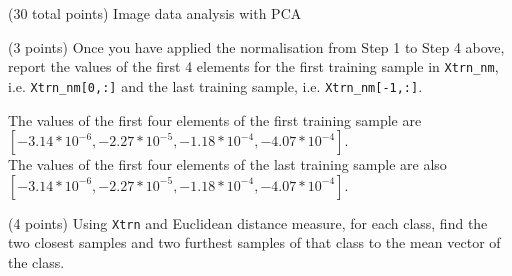 \documentclass[12pt]{article}
\begin{document}
\clearpage
%
%

\begin{question}{(30 total points) Image data analysis with PCA}

  
  

  
  \medskip

  \begin{subquestion}{(3 points)
      Once you have applied the normalisation from Step 1 to Step 4 above,
      report the values of the first 4 elements for the first training
      sample in \texttt{Xtrn\_nm},
      i.e. \texttt{Xtrn\_nm[0,:]} and the last training sample,
      i.e. \texttt{Xtrn\_nm[-1,:]}.
    } \label{Q1.1}
    

      \begin{answerbox}{10em}
         The values of the first four elements of the first training sample are $[-3.14*10^{-6},-2.27*10^{-5},-1.18*10^{-4},-4.07*10^{-4}]$.
\\The values of the first four elements of the last training sample are also $[-3.14*10^{-6},-2.27*10^{-5},-1.18*10^{-4},-4.07*10^{-4}]$.
      \end{answerbox}
  


   \end{subquestion}
   \begin{subquestion}{(4 points)
      Using {\tt Xtrn} and Euclidean distance
      measure, for each class,
      find the two closest samples and two furthest
      samples of that class to the mean vector of the class.
    }  \label{Q1.2}





\end{subquestion}
\end{question}
\end{document}
